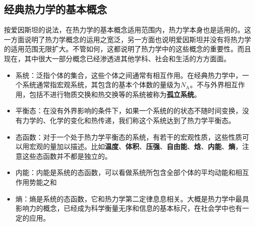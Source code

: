 \subsection{经典热力学的基本概念}
\qquad 按爱因斯坦的说法，在热力学的基本概念适用范围内，热力学本身也是适用的。这一方面说明了热力学概念的运用之宽泛，另一方面也说明爱因斯坦并没有将热力学的适用范围无限扩大。不管如何，这都说明了热力学中的这些概念的重要性。而且现在，其中很大一部分概念已经渗透进其他学科、社会和生活的方方面面。
\begin{itemize}
    \item 系统\cite{Wu2010}：泛指个体的集合，这些个体之间通常有相互作用。在经典热力学中，一个系统通常指宏观系统，其包含的基本个体数的量级为$N_{\mathrm{A}}$。不与外界相互作用，包括不进行物质交换和热交换等的系统被称为\textbf{孤立系统}。
    \item 平衡态：在没有外界影响的条件下，如果一个系统的的状态不随时间变换，没有力学的、化学的变化和热传递，我们称这个系统达到了热力学平衡态。
    \item 态函数：对于一个处于热力学平衡态的系统，有若干的宏观性质，这些性质可以用宏观的量加以描述。比如\textbf{温度}、\textbf{体积}、\textbf{压强}、\textbf{自由能}、\textbf{焓}、\textbf{内能}、\textbf{熵}，注意这些态函数并不都是独立的。
    \item 内能：内能是系统的态函数，可以看做系统所包含全部个体的平均动能和相互作用势能之和
    \item 熵：熵是系统的态函数，它和热力学第二定律息息相关。大概是热力学中最具影响力的概念，已经成为科学衡量无序和信息的基本标尺，在社会学中也有一定的应用。\cite{rifkin1980entropy}
\end{itemize}

